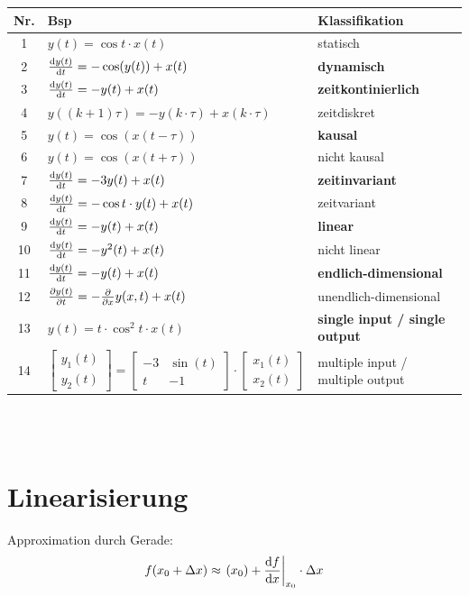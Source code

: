 \begin{tabular}{c|l|l}
 Nr. & Bsp & Klassifikation \\ 
\hline 1 & $y(t) = \cos t \cdot x(t)$ & statisch \\ 
	   2 & $\frac{\mathrm{d} y(t)}{\mathrm{d} t} = - \cos (y(t)) + x(t)$ & \textbf{dynamisch} \\ 
\hline 3 & $\frac{\mathrm{d} y(t)}{\mathrm{d} t} = -y(t) + x(t)$ & \textbf{zeitkontinierlich} \\ 
	   4 & $y((k+1)\tau)=-y(k\cdot \tau) + x(k \cdot \tau)$ & zeitdiskret \\ 
\hline 5 & $y(t) = \cos (x (t-\tau))$ & \textbf{kausal} \\ 
 	   6 & $y(t) = \cos(x(t+\tau))$ & nicht kausal \\ 
\hline 7 & $\frac{\mathrm{d} y(t)}{\mathrm{d} t} = -3y(t) + x(t)$ & \textbf{zeitinvariant} \\ 
	   8 & $\frac{\mathrm{d} y(t)}{\mathrm{d} t} = -\cos t \cdot y(t) +x(t)$ & zeitvariant \\ 
\hline 9 & $\frac{\mathrm{d} y(t)}{\mathrm{d} t} = -y(t) +x(t)$ & \textbf{linear} \\ 
	   10 & $\frac{\mathrm{d} y(t)}{\mathrm{d} t} = -y^2(t) +x(t)$ & nicht linear \\ 
\hline 11 & $\frac{\mathrm{d} y(t)}{\mathrm{d} t} = -y(t) +x(t)$ & \textbf{endlich-dimensional} \\ 
	   12 & $\frac{\partial y(t)}{\partial t} = - \frac{\partial }{\partial x}y(x,t)+x(t)$ & unendlich-dimensional \\ 
\hline 13 & $y(t) = t \cdot \cos^2 t \cdot x(t)$ & \textbf{single input / single output} \\ 
	   14 & $\left[ \begin{matrix} y_1(t) \\ y_2(t) \end{matrix}\right] = \left[ \begin{matrix} -3 & \sin(t) \\ t & -1\end{matrix}\right] \cdot \left[ \begin{matrix} x_1(t)\\ x_2(t) \end{matrix}\right]$ & multiple input / multiple output \\ 
\end{tabular} 
\\\\

\section{Linearisierung}
Approximation durch Gerade:
\[
	f(x_0+\Delta x) \approx \left.(x_0)+\frac{\mathrm{d} f}{\mathrm{d} x}\right|_{x_0}\cdot \Delta x
\]

